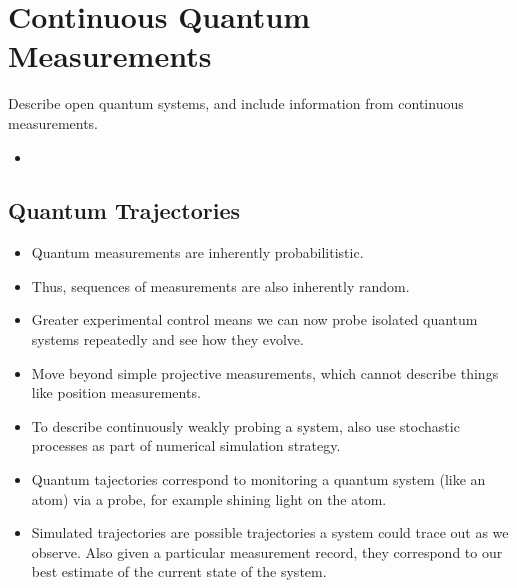 \section{Continuous Quantum Measurements}

Describe open quantum systems, and include information from continuous measurements. 
\begin{itemize}
  \item 
\end{itemize}


\subsection{Quantum Trajectories}

\begin{itemize}
\item Quantum measurements are inherently probabilitistic.  
\item Thus, sequences of measurements are also inherently random.  
\item Greater experimental control means we can now probe isolated quantum systems repeatedly and see how they evolve.  
\item Move beyond simple projective measurements, which cannot describe things like position measurements.
\item To describe continuously weakly probing a system, also use stochastic processes as part of
 numerical simulation strategy.
\item Quantum tajectories correspond to monitoring a quantum system (like an atom) via a probe,
 for example shining light on the atom. \cite{Carmichael1993}
\item Simulated trajectories are possible trajectories a system could trace out as we observe.
  Also given a particular measurement record, they correspond to our best estimate of the current state of the system.  
\end{itemize}



